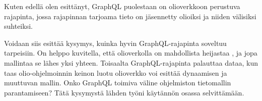 Kuten edellä olen esittänyt, GraphQL puolestaan on olioverkkoon
perustuva rajapinta, jossa rajapinnan tarjoama tieto on jäsennetty
olioiksi ja niiden välisiksi suhteiksi.

Voidaan siis esittää kysymys, kuinka hyvin GraphQL-rajapinta soveltuu
 tarpeisiin. On helppo
kuvitella, että olioverkolla on mahdollista heijastaa
, ja jopa mallintaa se lähes yksi yhteen.
Toisaalta GraphQL-rajapinta palauttaa dataa, kun taas olio-ohjelmoinnin
keinon luotu olioverkko voi esittää dynaamisen ja muuttuvan mallin. Onko
GraphQL toimiva väline ohjelmiston tietomallin parantamiseen? Tätä
kysymystä lähden työni käytännön osassa selvittämään.
